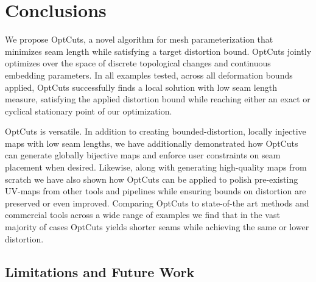 
\section{Conclusions}
\label{sec:conclusion}

We propose OptCuts, a novel algorithm for mesh parameterization that minimizes seam length while satisfying a target distortion bound. OptCuts jointly optimizes over the space of discrete topological changes and continuous embedding parameters. In all examples tested, across all deformation bounds applied, OptCuts successfully finds a local solution with low seam length measure, satisfying the applied distortion bound while reaching either an exact or cyclical stationary point of our optimization. 

OptCuts is versatile. In addition to creating bounded-distortion, locally injective maps with low seam lengths, we have additionally demonstrated how OptCuts can generate globally bijective maps and enforce user constraints on seam placement when desired. Likewise, along with generating high-quality maps from scratch we have also shown how OptCuts can be applied to polish pre-existing UV-maps from other tools and pipelines while ensuring bounds on distortion are preserved or even improved. Comparing OptCuts to state-of-the art methods and commercial tools across a wide range of examples we find that in the vast majority of cases OptCuts yields shorter seams while achieving the same or lower distortion. 

\subsection{Limitations and Future Work}

